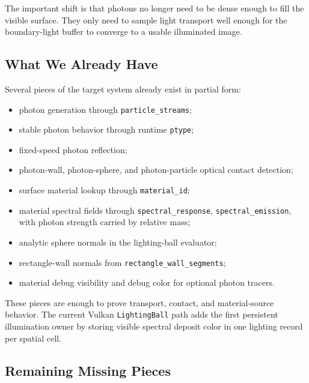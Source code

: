 The important shift is that photons no longer need to be dense enough to fill
the visible surface.  They only need to sample light transport well enough for
the boundary-light buffer to converge to a usable illuminated image.

\subsection{What We Already Have}

Several pieces of the target system already exist in partial form:
\begin{itemize}
    \item photon generation through \texttt{particle\_streams};
    \item stable photon behavior through runtime \texttt{ptype};
    \item fixed-speed photon reflection;
    \item photon-wall, photon-sphere, and photon-particle optical contact
          detection;
    \item surface material lookup through \texttt{material\_id};
    \item material spectral fields through \texttt{spectral\_response},
          \texttt{spectral\_emission}, with photon strength carried by
          relative mass;
    \item analytic sphere normals in the lighting-ball evaluator;
    \item rectangle-wall normals from \texttt{rectangle\_wall\_segments};
    \item material debug visibility and debug color for optional photon
          tracers.
\end{itemize}

These pieces are enough to prove transport, contact, and material-source
behavior.  The current Vulkan \texttt{LightingBall} path adds the first
persistent illumination owner by storing visible spectral deposit color in one
lighting record per spatial cell.

\subsection{Remaining Missing Pieces}

